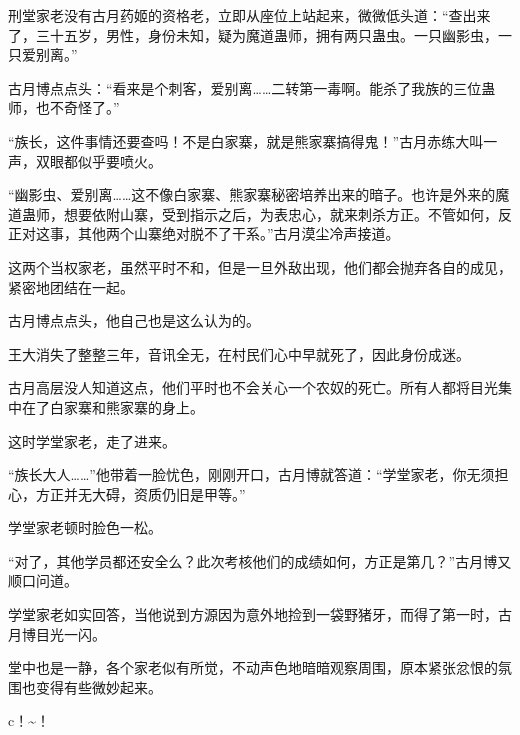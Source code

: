 \begin{this_body}
刑堂家老没有古月药姬的资格老，立即从座位上站起来，微微低头道：“查出来了，三十五岁，男性，身份未知，疑为魔道蛊师，拥有两只蛊虫。一只幽影虫，一只爱别离。”

古月博点点头：“看来是个刺客，爱别离……二转第一毒啊。能杀了我族的三位蛊师，也不奇怪了。”

“族长，这件事情还要查吗！不是白家寨，就是熊家寨搞得鬼！”古月赤练大叫一声，双眼都似乎要喷火。

“幽影虫、爱别离……这不像白家寨、熊家寨秘密培养出来的暗子。也许是外来的魔道蛊师，想要依附山寨，受到指示之后，为表忠心，就来刺杀方正。不管如何，反正对这事，其他两个山寨绝对脱不了干系。”古月漠尘冷声接道。

这两个当权家老，虽然平时不和，但是一旦外敌出现，他们都会抛弃各自的成见，紧密地团结在一起。

古月博点点头，他自己也是这么认为的。

王大消失了整整三年，音讯全无，在村民们心中早就死了，因此身份成迷。

古月高层没人知道这点，他们平时也不会关心一个农奴的死亡。所有人都将目光集中在了白家寨和熊家寨的身上。

这时学堂家老，走了进来。

“族长大人……”他带着一脸忧色，刚刚开口，古月博就答道：“学堂家老，你无须担心，方正并无大碍，资质仍旧是甲等。”

学堂家老顿时脸色一松。

“对了，其他学员都还安全么？此次考核他们的成绩如何，方正是第几？”古月博又顺口问道。

学堂家老如实回答，当他说到方源因为意外地捡到一袋野猪牙，而得了第一时，古月博目光一闪。

堂中也是一静，各个家老似有所觉，不动声色地暗暗观察周围，原本紧张忿恨的氛围也变得有些微妙起来。

c！\~{}！

\end{this_body}

